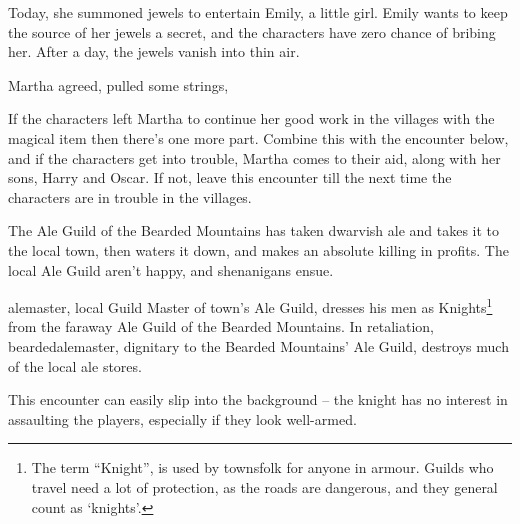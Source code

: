 \begin{multicols}{2}
Today, she summoned jewels to entertain Emily, a little girl.
Emily wants to keep the source of her jewels a secret, and the characters have zero chance of bribing her.
After a day, the jewels vanish into thin air.

Martha agreed, pulled some strings, 




If the characters left Martha to continue her good work in the villages with the magical item then there's one more part.
Combine this with the encounter below, and if the characters get into trouble, Martha comes to their aid, along with her sons, Harry and Oscar.
If not, leave this encounter till the next time the characters are in trouble in the villages.


\humansoldier

\stopcontents[sq]


\startcontents[sq]

\sqminitoc

The Ale Guild of the Bearded Mountains has taken dwarvish ale and takes it to the local town, then waters it down, and makes an absolute killing in profits.
The local Ale Guild aren't happy, and shenanigans ensue.

\Gls{alemaster}, local Guild Master of town's Ale Guild, dresses his men as Knights\footnote{The term ``Knight'', is used by townsfolk for anyone in armour.
Guilds who travel need a lot of protection, as the roads are dangerous, and they general count as `knights'.} from the faraway Ale Guild of the Bearded Mountains.
In retaliation, \gls{beardedalemaster}, dignitary to the Bearded Mountains' Ale Guild, destroys much of the local ale stores.


This encounter can easily slip into the background -- the knight has no interest in assaulting the players, especially if they look well-armed.

\begin{boxtext}


\end{boxtext}
\end{multicols}
